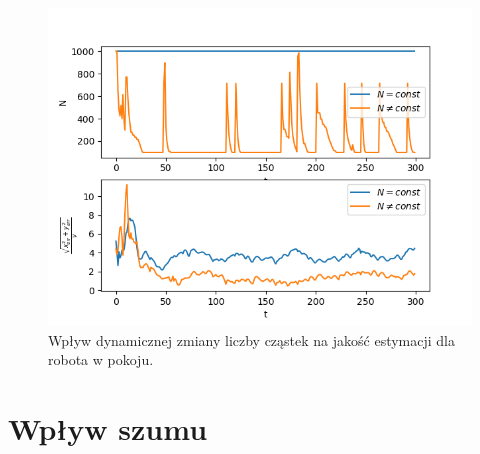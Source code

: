 \begin{figure}[H]
	\begin{center}
		\includegraphics[width=12cm]{./dynamic_N.png}
		\caption{Wpływ dynamicznej zmiany liczby cząstek na jakość estymacji dla robota w pokoju.}
		\label{dynamic_N}
	\end{center}
\end{figure}

\section{Wpływ szumu}

